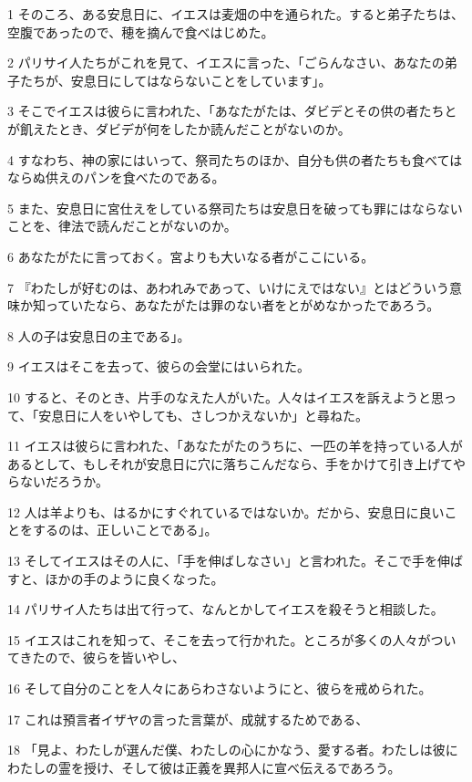 \par 1 そのころ、ある安息日に、イエスは麦畑の中を通られた。すると弟子たちは、空腹であったので、穂を摘んで食べはじめた。
\par 2 パリサイ人たちがこれを見て、イエスに言った、「ごらんなさい、あなたの弟子たちが、安息日にしてはならないことをしています」。
\par 3 そこでイエスは彼らに言われた、「あなたがたは、ダビデとその供の者たちとが飢えたとき、ダビデが何をしたか読んだことがないのか。
\par 4 すなわち、神の家にはいって、祭司たちのほか、自分も供の者たちも食べてはならぬ供えのパンを食べたのである。
\par 5 また、安息日に宮仕えをしている祭司たちは安息日を破っても罪にはならないことを、律法で読んだことがないのか。
\par 6 あなたがたに言っておく。宮よりも大いなる者がここにいる。
\par 7 『わたしが好むのは、あわれみであって、いけにえではない』とはどういう意味か知っていたなら、あなたがたは罪のない者をとがめなかったであろう。
\par 8 人の子は安息日の主である」。
\par 9 イエスはそこを去って、彼らの会堂にはいられた。
\par 10 すると、そのとき、片手のなえた人がいた。人々はイエスを訴えようと思って、「安息日に人をいやしても、さしつかえないか」と尋ねた。
\par 11 イエスは彼らに言われた、「あなたがたのうちに、一匹の羊を持っている人があるとして、もしそれが安息日に穴に落ちこんだなら、手をかけて引き上げてやらないだろうか。
\par 12 人は羊よりも、はるかにすぐれているではないか。だから、安息日に良いことをするのは、正しいことである」。
\par 13 そしてイエスはその人に、「手を伸ばしなさい」と言われた。そこで手を伸ばすと、ほかの手のように良くなった。
\par 14 パリサイ人たちは出て行って、なんとかしてイエスを殺そうと相談した。
\par 15 イエスはこれを知って、そこを去って行かれた。ところが多くの人々がついてきたので、彼らを皆いやし、
\par 16 そして自分のことを人々にあらわさないようにと、彼らを戒められた。
\par 17 これは預言者イザヤの言った言葉が、成就するためである、
\par 18 「見よ、わたしが選んだ僕、わたしの心にかなう、愛する者。わたしは彼にわたしの霊を授け、そして彼は正義を異邦人に宣べ伝えるであろう。
